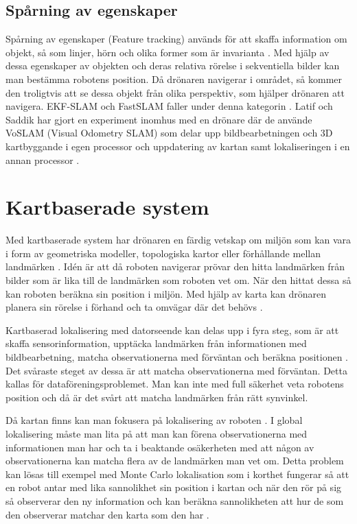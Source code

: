 \subsection{Spårning av egenskaper}

Spårning av egenskaper (Feature tracking) används för att skaffa information om objekt, så som linjer, hörn och olika former som är invarianta \citep{geospatial}. Med hjälp av dessa egenskaper av objekten och deras relativa rörelse i sekventiella bilder kan man bestämma robotens position. Då drönaren navigerar i området, så kommer den troligtvis att se dessa objekt från olika perspektiv, som hjälper drönaren att navigera. EKF-SLAM och FastSLAM faller under denna kategorin \citep{8930783}. Latif och Saddik har gjort en experiment inomhus med en drönare där de använde VoSLAM (Visual Odometry SLAM) som delar upp bildbearbetningen och 3D kartbyggande i egen processor och uppdatering av kartan samt lokaliseringen i en annan processor \citep{8930783}.

\section{Kartbaserade system}

Med kartbaserade system har drönaren en färdig vetskap om miljön som kan vara i form av geometriska modeller, topologiska kartor eller förhållande mellan landmärken \citep{982903}. Idén är att då roboten navigerar prövar den hitta landmärken från bilder som är lika till de landmärken som roboten vet om. När den hittat dessa så kan roboten beräkna sin position i miljön. Med hjälp av karta kan drönaren planera sin rörelse i förhand och ta omvägar där det behövs \citep{geospatial}. 

Kartbaserad lokalisering med datorseende kan delas upp i fyra steg, som är att skaffa sensorinformation, upptäcka landmärken från informationen med bildbearbetning, matcha observationerna med förväntan och beräkna positionen \citep{982903}. Det svåraste steget av dessa är att matcha observationerna med förväntan. Detta kallas för dataföreningsproblemet. Man kan inte med full säkerhet veta robotens position och då är det svårt att matcha landmärken från rätt synvinkel.

Då kartan finns kan man fokusera på lokalisering av roboten \citep{982903}. I global lokalisering måste man lita på att man kan förena observationerna med informationen man har och ta i beaktande osäkerheten med att någon av observationerna kan matcha flera av de landmärken man vet om. Detta problem kan lösas till exempel med Monte Carlo lokalisation som i korthet fungerar så att en robot antar med lika sannolikhet sin position i kartan och när den rör på sig så observerar den ny information och kan beräkna sannolikheten att hur de som den observerar matchar den karta som den har \citep{772544}.


